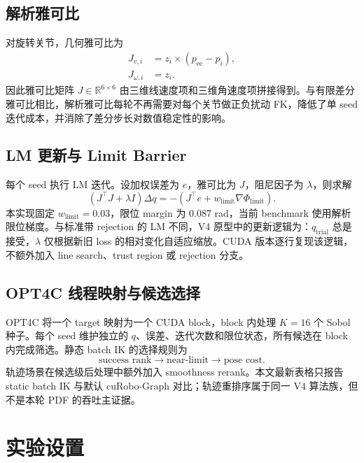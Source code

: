 \documentclass[twocolumn,a4paper,10pt]{ctexart}
\newcommand{\R}{\mathbb{R}}
\begin{document}
\subsection{解析雅可比}

对旋转关节，几何雅可比为
\begin{align}
J_{v,i} &= z_i \times (p_{\mathrm{ee}}-p_i),\\
J_{\omega,i} &= z_i.
\end{align}
因此雅可比矩阵 $J\in\R^{6\times6}$ 由三维线速度项和三维角速度项拼接得到。与有限差分雅可比相比，解析雅可比每轮不再需要对每个关节做正负扰动 FK，降低了单 seed 迭代成本，并消除了差分步长对数值稳定性的影响。

\subsection{LM 更新与 Limit Barrier}

每个 seed 执行 LM 迭代。设加权误差为 $e$，雅可比为 $J$，阻尼因子为 $\lambda$，则求解
\begin{equation}
(J^\top J+\lambda I)\Delta q=-(J^\top e+w_{\mathrm{limit}}\nabla\Phi_{\mathrm{limit}}).
\end{equation}
本实现固定 $w_{\mathrm{limit}}=0.03$，限位 margin 为 0.087 rad，当前 benchmark 使用解析限位梯度。与标准带 rejection 的 LM 不同，V4 原型中的更新逻辑为：$q_{\mathrm{trial}}$ 总是接受，$\lambda$ 仅根据新旧 loss 的相对变化自适应缩放。CUDA 版本逐行复现该逻辑，不额外加入 line search、trust region 或 rejection 分支。

\subsection{OPT4C 线程映射与候选选择}

OPT4C 将一个 target 映射为一个 CUDA block，block 内处理 $K=16$ 个 Sobol 种子。每个 seed 维护独立的 $q$、误差、迭代次数和限位状态，所有候选在 block 内完成筛选。静态 batch IK 的选择规则为
\begin{equation}
\text{success rank}\rightarrow \text{near-limit}\rightarrow \text{pose cost}.
\end{equation}
轨迹场景在候选级后处理中额外加入 smoothness rerank。本文最新表格只报告 static batch IK 与默认 cuRobo-Graph 对比；轨迹重排序属于同一 V4 算法族，但不是本轮 PDF 的吞吐主证据。

\section{实验设置}
\end{document}
